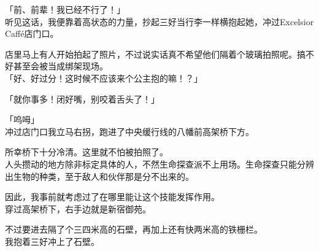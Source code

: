 「前、前辈！我已经不行了！」\\

听见这话，我便靠着高状态的力量，抄起三好当行李一样横抱起她，冲过Excelsior Caffé店门口。

店里马上有人开始拍起了照片，不过说实话真不希望他们隔着个玻璃拍照呢。搞不好甚至会被当成绑架现场。\\

「好、好过分！这时候不应该来个公主抱的嘛！？」

「就你事多！闭好嘴，别咬着舌头了！」

「呜呣」\\

冲过店门口我立马右拐，跑进了中央缓行线的八幡前高架桥下方。

所幸桥下十分冷清。这里就不怕被拍照了。\\

人头攒动的地方除非标定具体的人，不然生命探查派不上用场。生命探查只能分辨出生物的种类，至于敌人和伙伴那是分不出来的。

因此，我事前就考虑过了在哪里能让这个技能发挥作用。\\

穿过高架桥下，右手边就是新宿御苑。

不过要进去隔了个三四米高的石壁，再加上还有快两米高的铁栅栏。\\

我抱着三好冲上了石壁。\\

